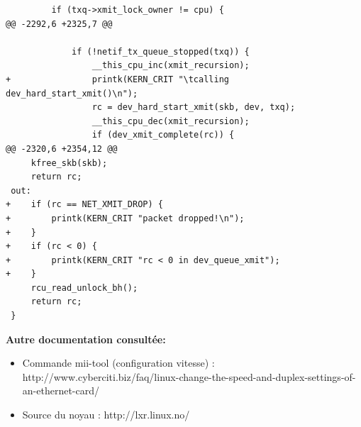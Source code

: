 \documentclass[a4paper]{article}
\begin{document}
\begin{verbatim}
         if (txq->xmit_lock_owner != cpu) {
@@ -2292,6 +2325,7 @@
 
             if (!netif_tx_queue_stopped(txq)) {
                 __this_cpu_inc(xmit_recursion);
+                printk(KERN_CRIT "\tcalling dev_hard_start_xmit()\n");
                 rc = dev_hard_start_xmit(skb, dev, txq);
                 __this_cpu_dec(xmit_recursion);
                 if (dev_xmit_complete(rc)) {
@@ -2320,6 +2354,12 @@
     kfree_skb(skb);
     return rc;
 out:
+    if (rc == NET_XMIT_DROP) {
+        printk(KERN_CRIT "packet dropped!\n");
+    }
+    if (rc < 0) {
+        printk(KERN_CRIT "rc < 0 in dev_queue_xmit");
+    }
     rcu_read_unlock_bh();
     return rc;
 }
\end{verbatim}
\newpage



\textbf{Autre documentation consultée:}
\begin{itemize}
	\item Commande mii-tool (configuration vitesse) : 
	http://www.cyberciti.biz/faq/linux-change-the-speed-and-duplex-settings-of-an-ethernet-card/
	\item Source du noyau : http://lxr.linux.no/
\end{itemize}
\end{document}
